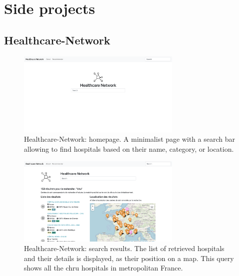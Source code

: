 \chapter{Side projects}

\section{Healthcare-Network}

\begin{figure}[H]
    \includegraphics[width=0.7\textwidth]{images/healthcare-network/home.png}
    \centering
    \caption{
        Healthcare-Network: homepage. A minimalist page with a search bar allowing to find hospitals based on their name, category, or location.
    }
    \label{fig:hn-home}
\end{figure}


\begin{figure}[H]
    \includegraphics[width=0.7\textwidth]{images/healthcare-network/search.png}
    \centering
    \caption{
        Healthcare-Network: search results. The list of retrieved hospitals and their details is displayed, as their position on a map. This query shows all the \ac{chru} hospitals in metropolitan France.
    }
    \label{fig:hn-search}
\end{figure}


